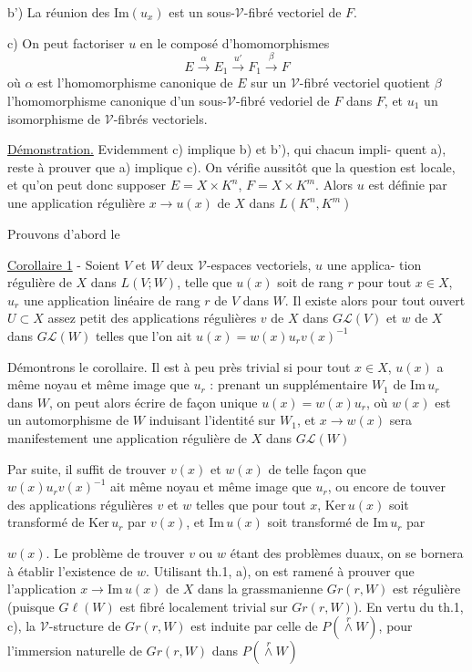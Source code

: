 b') La réunion des $\mathrm{Im}(u_x)$ est un sous-$\mathcal{V}$-fibré vectoriel de $F$.

c) On peut factoriser $u$ en le composé d'homomorphismes
$$ E \xrightarrow{\alpha} E_1 \xrightarrow{u'} F_1 \xrightarrow{\beta} F $$
où $\alpha$ est l'homomorphisme canonique de $E$ sur un $\mathcal{V}$-fibré vectoriel quotient
$\beta$ l'homomorphisme canonique d'un sous-$\mathcal{V}$-fibré vedoriel de $F$ dans $F$,
et $u_1$ un isomorphisme de $\mathcal{V}$-fibrés vectoriels.

\underline{Démonstration.} Evidemment c) implique b) et b'), qui chacun impli-
quent a), reste à prouver que a) implique c). On vérifie aussitôt que la
question est locale, et qu'on peut donc supposer $E=X \times K^n$, $F=X \times K^m$. Alors
$u$ est définie par une application régulière $x \to u(x)$ de $X$ dans $L(K^n,K^m)$

Prouvons d'abord le

\underline{Corollaire 1} - Soient $V$ et $W$ deux $\mathcal{V}$-espaces vectoriels, $u$ une applica-
tion régulière de $X$ dans $L(V;W)$, telle que $u(x)$ soit de rang $r$ pour tout
$x \in X$, $u_r$ une application linéaire de rang $r$ de $V$ dans $W$. Il existe alors
pour tout ouvert $U \subset X$ assez petit des applications régulières $v$ de $X$
dans $G\mathcal{L}(V)$ et $w$ de $X$ dans $G\mathcal{L}(W)$ telles que l'on ait $u(x)=w(x)u_r v(x)^{-1}$

Démontrons le corollaire. Il est à peu près trivial si pour tout
$x \in X$, $u(x)$ a même noyau et même image que $u_r$ : prenant un supplémentaire
$W_1$ de $\mathrm{Im} \, u_r$ dans $W$, on peut alors écrire de façon unique $u(x)=w(x)u_r$,
où $w(x)$ est un automorphisme de $W$ induisant l'identité sur $W_1$, et
$x \to w(x)$ sera manifestement une application régulière de $X$ dans $G\mathcal{L}(W)$

Par suite, il suffit de trouver $v(x)$ et $w(x)$ de telle façon que
$w(x)u_r v(x)^{-1}$ ait même noyau et même image que $u_r$, ou encore de touver
des applications régulières $v$ et $w$ telles que pour tout $x$, $\mathrm{Ker} \, u(x)$ soit
transformé de $\mathrm{Ker} \, u_r$ par $v(x)$, et $\mathrm{Im} \, u(x)$ soit transformé de $\mathrm{Im} \, u_r$ par

\newpage



$w(x)$. Le problème de trouver $v$ ou $w$ étant des problèmes duaux, on se
bornera à établir l'existence de $w$. Utilisant th.1, a), on est ramené
à prouver que l'application $x \to \mathrm{Im}\, u(x)$ de $X$ dans la grassmanienne
$Gr(r,W)$ est régulière (puisque $G\ell(W)$ est fibré localement trivial sur
$Gr(r,W)$). En vertu du th.1, c), la $\mathcal{V}$-structure de $Gr(r,W)$ est induite
par celle de $P(\overset{r}{\wedge} W)$, pour l'immersion naturelle de $Gr(r,W)$ dans $P(\overset{r}{\wedge} W)$

